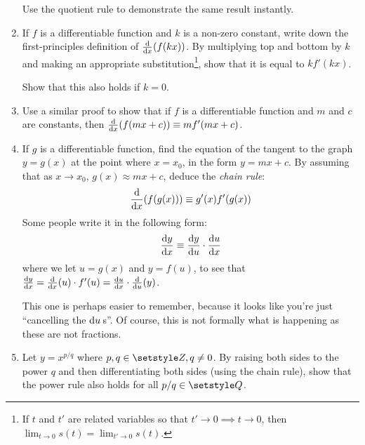 \begin{enumerate}
  Use the quotient rule to demonstrate the same result instantly.
 \item
  If \(f\) is a differentiable function and \(k\) is a non-zero constant,
  write down the first-principles definition of \(\dv{x}(f(kx))\). By
  multiplying top and bottom by \(k\) and making an appropriate
  substitution\footnote{
   If \(t\) and \(t'\) are related variables so that
   \(t' \to 0 \implies t \to 0\), then
   \(\lim_{t \to 0} s(t) = \lim_{t' \to 0} s(t)\).
  }, show that it is equal to \(kf'(kx)\).

  Show that this also holds if \(k = 0\).
 \item
  Use a similar proof to show that if \(f\) is a differentiable function and
  \(m\) and \(c\) are constants, then \(\dv{x}(f(mx + c)) \equiv mf'(mx + c)\).
 \item
  If \(g\) is a differentiable function, find the equation of the tangent to the
  graph \(y = g(x)\) at the point where \(x = x_0\), in the form
  \(y = mx + c\). By assuming that as \(x \to x_0\), \(g(x) \approx mx + c\),
  deduce the \emph{chain rule}:
  \begin{equation*}
   \dv{x}(f(g(x))) \equiv g'(x) f'(g(x))
  \end{equation*}
  Some people write it in the following form:
  \begin{equation*}
   \dv<y>{x} \equiv \dv<y>{u} \cdot \dv<u>{x}
  \end{equation*}
  where we let \(u = g(x)\) and \(y = f(u)\), to see that
  \(\dv<y>{x}
    = \dv{x}(u) \cdot f'(u)
    = \dv<u>{x} \cdot \dv{u}(y)\).

  This one is perhaps easier to remember, because it looks like you're just
  ``cancelling the \(\mathrm d u\,\)s''. Of course, this is not formally what is
  happening as these are not fractions.
 \item
  Let \(y = x^{p/q}\) where \(p, q \in \Integers, q \ne 0\). By raising both
  sides to the power \(q\) and then differentiating both sides (using the chain
  rule), show that the power rule also holds for all \(p / q \in \Rationals\).


\end{enumerate}
